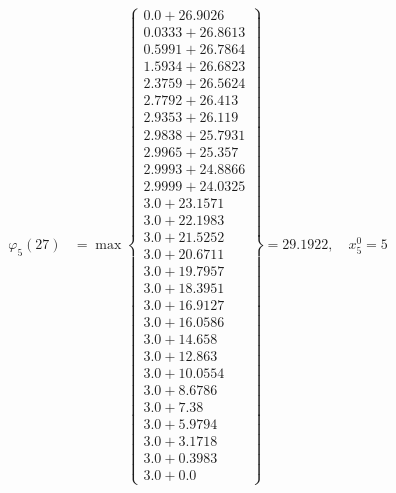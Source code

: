 \documentclass{article}
\begin{document}
\begin{align*}
  
\varphi_{5}(27) &= \max \left\{ \begin{array}{c}
0.0 + 26.9026 \\
 0.0333 + 26.8613 \\
 0.5991 + 26.7864 \\
 1.5934 + 26.6823 \\
 2.3759 + 26.5624 \\
 2.7792 + 26.413 \\
 2.9353 + 26.119 \\
 2.9838 + 25.7931 \\
 2.9965 + 25.357 \\
 2.9993 + 24.8866 \\
 2.9999 + 24.0325 \\
 3.0 + 23.1571 \\
 3.0 + 22.1983 \\
 3.0 + 21.5252 \\
 3.0 + 20.6711 \\
 3.0 + 19.7957 \\
 3.0 + 18.3951 \\
 3.0 + 16.9127 \\
 3.0 + 16.0586 \\
 3.0 + 14.658 \\
 3.0 + 12.863 \\
 3.0 + 10.0554 \\
 3.0 + 8.6786 \\
 3.0 + 7.38 \\
 3.0 + 5.9794 \\
 3.0 + 3.1718 \\
 3.0 + 0.3983 \\
 3.0 + 0.0
\end{array} \right\}=29.1922,\quad x_{5}^0=5\\
  
  
  

\end{align*}
\end{document}
